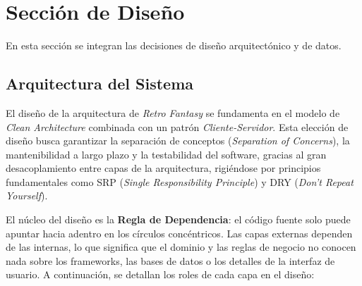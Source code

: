 \section{Sección de Diseño}
\label{sec:seccion_diseno}

En esta sección se integran las decisiones de diseño arquitectónico y de datos.

\subsection{Arquitectura del Sistema}
El diseño de la arquitectura de \textit{Retro Fantasy} se fundamenta en el modelo de \textit{Clean Architecture} combinada con un patrón \textit{Cliente-Servidor}. Esta elección de diseño busca garantizar la separación de conceptos (\textit{Separation of Concerns}), la mantenibilidad a largo plazo y la testabilidad del software, gracias al gran desacoplamiento entre capas de la arquitectura, rigiéndose por principios fundamentales como SRP (\textit{Single Responsibility Principle}) y DRY (\textit{Don't Repeat Yourself}).

El núcleo del diseño es la \textbf{Regla de Dependencia}: el código fuente solo puede apuntar hacia adentro en los círculos concéntricos. Las capas externas dependen de las internas, lo que significa que el dominio y las reglas de negocio no conocen nada sobre los frameworks, las bases de datos o los detalles de la interfaz de usuario. A continuación, se detallan los roles de cada capa en el diseño:

